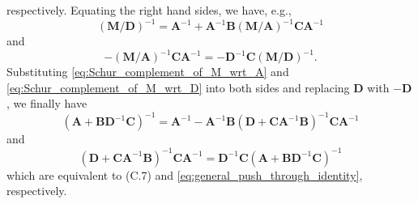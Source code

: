 \documentclass[12pt,a4paper]{article}
\begin{document}
respectively.
Equating the right hand sides, we have, e.g.,
\begin{equation}
\left(\mathbf{M}/\mathbf{D}\right)^{-1} =
\mathbf{A}^{-1} +
\mathbf{A}^{-1}\mathbf{B} \left(\mathbf{M}/\mathbf{A}\right)^{-1} \mathbf{C}\mathbf{A}^{-1}
\end{equation}
and
\begin{equation}
-\left(\mathbf{M}/\mathbf{A}\right)^{-1} \mathbf{C}\mathbf{A}^{-1} =
-\mathbf{D}^{-1}\mathbf{C} \left(\mathbf{M}/\mathbf{D}\right)^{-1} .
\end{equation}
Substituting \eqref{eq:Schur_complement_of_M_wrt_A} and \eqref{eq:Schur_complement_of_M_wrt_D}
into both sides and
replacing $\mathbf{D}$ with $-\mathbf{D}$,
we finally have
\begin{equation}
\left(\mathbf{A} + \mathbf{B}\mathbf{D}^{-1}\mathbf{C}\right)^{-1} =
\mathbf{A}^{-1} -
\mathbf{A}^{-1}\mathbf{B}
\left(\mathbf{D} + \mathbf{C}\mathbf{A}^{-1}\mathbf{B}\right)^{-1}
\mathbf{C}\mathbf{A}^{-1}
\end{equation}
and
\begin{equation}
\left(\mathbf{D} + \mathbf{C}\mathbf{A}^{-1}\mathbf{B}\right)^{-1} \mathbf{C}\mathbf{A}^{-1} =
\mathbf{D}^{-1}\mathbf{C} \left(\mathbf{A} + \mathbf{B}\mathbf{D}^{-1}\mathbf{C}\right)^{-1}
\end{equation}
which are equivalent to (C.7) and \eqref{eq:general_push_through_identity}, respectively.
\end{document}
